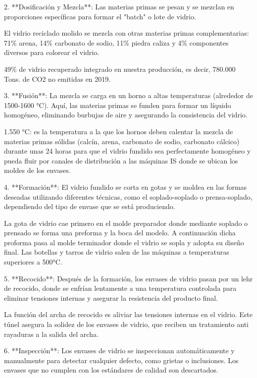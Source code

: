 \documentclass[main.tex]{subfiles}
\begin{document}
2. **Dosificación y Mezcla**: Las materias primas se pesan y se mezclan en proporciones específicas para formar el "batch" o lote de vidrio.

El vidrio reciclado molido se mezcla con otras materias primas complementarias: 71\% arena, 14\% carbonato de sodio, 11\% piedra caliza y 4\% componentes diversos para colorear el vidrio.

49\% de vidrio recuperado integrado en nuestra producción, es decir, 780.000 Tons. de CO2 no emitidas en 2019. 

3. **Fusión**: La mezcla se carga en un horno a altas temperaturas (alrededor de 1500-1600 °C). Aquí, las materias primas se funden para formar un líquido homogéneo, eliminando burbujas de aire y asegurando la consistencia del vidrio. 

1.550 °C: es la temperatura a la que los hornos deben calentar la mezcla de materias primas sólidas (calcín, arena, carbonato de sodio, carbonato cálcico) durante unas 24 horas para que el vidrio fundido sea perfectamente homogéneo y pueda fluir por canales de distribución a las máquinas IS donde se ubican los moldes de los envases.

4. **Formación**: El vidrio fundido se corta en gotas y se moldea en las formas deseadas utilizando diferentes técnicas, como el soplado-soplado o prensa-soplado, dependiendo del tipo de envase que se está produciendo.

La gota de vidrio cae primero en el molde preparador donde mediante soplado o prensado se forma una preforma y la boca del modelo. A continuación dicha proforma pasa al molde terminador donde el vidrio se sopla y adopta su diseño final. Las botellas y tarros de vidrio salen de las máquinas a temperaturas superiores a 500°C.

5. **Recocido**: Después de la formación, los envases de vidrio pasan por un lehr de recocido, donde se enfrían lentamente a una temperatura controlada para eliminar tensiones internas y asegurar la resistencia del producto final.

La función del archa de recocido es aliviar las tensiones internas en el vidrio. Este túnel asegura la solidez de los envases de vidrio, que reciben un tratamiento anti rayaduras a la salida del archa.

6. **Inspección**: Los envases de vidrio se inspeccionan automáticamente y manualmente para detectar cualquier defecto, como grietas o inclusiones. Los envases que no cumplen con los estándares de calidad son descartados.
\end{document}
